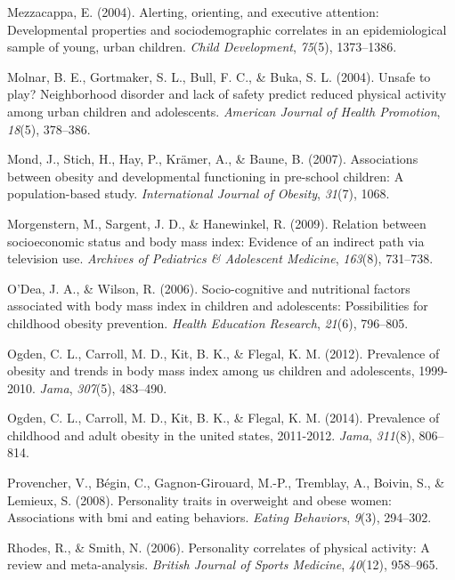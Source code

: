 \documentclass[man]{apa6}
\begin{document}
\leavevmode\hypertarget{ref-mezzacappa2004alerting}{}%
Mezzacappa, E. (2004). Alerting, orienting, and executive attention: Developmental properties and sociodemographic correlates in an epidemiological sample of young, urban children. \emph{Child Development}, \emph{75}(5), 1373--1386.

\leavevmode\hypertarget{ref-molnar2004unsafe}{}%
Molnar, B. E., Gortmaker, S. L., Bull, F. C., \& Buka, S. L. (2004). Unsafe to play? Neighborhood disorder and lack of safety predict reduced physical activity among urban children and adolescents. \emph{American Journal of Health Promotion}, \emph{18}(5), 378--386.

\leavevmode\hypertarget{ref-mond2007associations}{}%
Mond, J., Stich, H., Hay, P., Krämer, A., \& Baune, B. (2007). Associations between obesity and developmental functioning in pre-school children: A population-based study. \emph{International Journal of Obesity}, \emph{31}(7), 1068.

\leavevmode\hypertarget{ref-morgenstern2009relation}{}%
Morgenstern, M., Sargent, J. D., \& Hanewinkel, R. (2009). Relation between socioeconomic status and body mass index: Evidence of an indirect path via television use. \emph{Archives of Pediatrics \& Adolescent Medicine}, \emph{163}(8), 731--738.

\leavevmode\hypertarget{ref-o2006socio}{}%
O'Dea, J. A., \& Wilson, R. (2006). Socio-cognitive and nutritional factors associated with body mass index in children and adolescents: Possibilities for childhood obesity prevention. \emph{Health Education Research}, \emph{21}(6), 796--805.

\leavevmode\hypertarget{ref-ogden2012prevalence}{}%
Ogden, C. L., Carroll, M. D., Kit, B. K., \& Flegal, K. M. (2012). Prevalence of obesity and trends in body mass index among us children and adolescents, 1999-2010. \emph{Jama}, \emph{307}(5), 483--490.

\leavevmode\hypertarget{ref-ogden2014prevalence}{}%
Ogden, C. L., Carroll, M. D., Kit, B. K., \& Flegal, K. M. (2014). Prevalence of childhood and adult obesity in the united states, 2011-2012. \emph{Jama}, \emph{311}(8), 806--814.

\leavevmode\hypertarget{ref-provencher2008personality}{}%
Provencher, V., Bégin, C., Gagnon-Girouard, M.-P., Tremblay, A., Boivin, S., \& Lemieux, S. (2008). Personality traits in overweight and obese women: Associations with bmi and eating behaviors. \emph{Eating Behaviors}, \emph{9}(3), 294--302.

\leavevmode\hypertarget{ref-rhodes2006personality}{}%
Rhodes, R., \& Smith, N. (2006). Personality correlates of physical activity: A review and meta-analysis. \emph{British Journal of Sports Medicine}, \emph{40}(12), 958--965.
\end{document}

